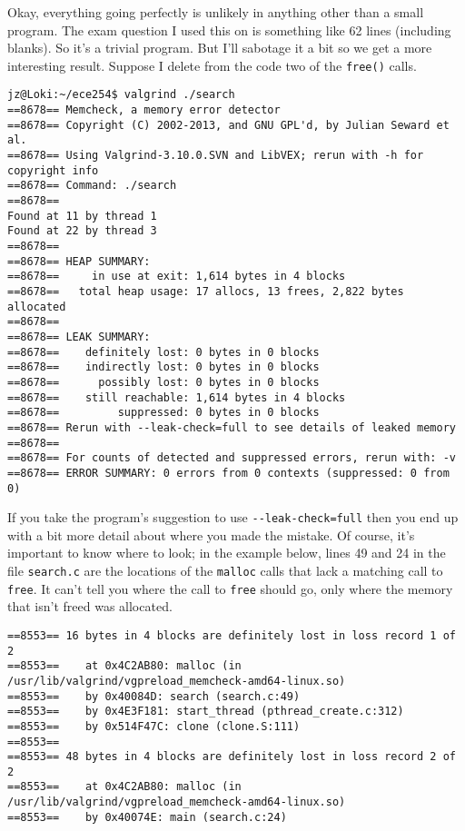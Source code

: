 Okay, everything going perfectly is unlikely in anything other than a small program. The exam question I used this on is something like 62 lines (including blanks). So it's a trivial program. But I'll sabotage it a bit so we get a more interesting result. Suppose I delete from the code two of the \texttt{free()} calls.

\begin{lstlisting}
jz@Loki:~/ece254$ valgrind ./search 
==8678== Memcheck, a memory error detector
==8678== Copyright (C) 2002-2013, and GNU GPL'd, by Julian Seward et al.
==8678== Using Valgrind-3.10.0.SVN and LibVEX; rerun with -h for copyright info
==8678== Command: ./search
==8678== 
Found at 11 by thread 1 
Found at 22 by thread 3 
==8678== 
==8678== HEAP SUMMARY:
==8678==     in use at exit: 1,614 bytes in 4 blocks
==8678==   total heap usage: 17 allocs, 13 frees, 2,822 bytes allocated
==8678== 
==8678== LEAK SUMMARY:
==8678==    definitely lost: 0 bytes in 0 blocks
==8678==    indirectly lost: 0 bytes in 0 blocks
==8678==      possibly lost: 0 bytes in 0 blocks
==8678==    still reachable: 1,614 bytes in 4 blocks
==8678==         suppressed: 0 bytes in 0 blocks
==8678== Rerun with --leak-check=full to see details of leaked memory
==8678== 
==8678== For counts of detected and suppressed errors, rerun with: -v
==8678== ERROR SUMMARY: 0 errors from 0 contexts (suppressed: 0 from 0)
\end{lstlisting}

If you take the program's suggestion to use \verb+--leak-check=full+ then you end up with a bit more detail about where you made the mistake. Of course, it's important to know where to look; in the example below, lines 49 and 24 in the file \texttt{search.c} are the locations of the \texttt{malloc} calls that lack a matching call to \texttt{free}. It can't tell you where the call to \texttt{free} should go, only where the memory that isn't freed was allocated.

\begin{lstlisting}
==8553== 16 bytes in 4 blocks are definitely lost in loss record 1 of 2
==8553==    at 0x4C2AB80: malloc (in /usr/lib/valgrind/vgpreload_memcheck-amd64-linux.so)
==8553==    by 0x40084D: search (search.c:49)
==8553==    by 0x4E3F181: start_thread (pthread_create.c:312)
==8553==    by 0x514F47C: clone (clone.S:111)
==8553== 
==8553== 48 bytes in 4 blocks are definitely lost in loss record 2 of 2
==8553==    at 0x4C2AB80: malloc (in /usr/lib/valgrind/vgpreload_memcheck-amd64-linux.so)
==8553==    by 0x40074E: main (search.c:24)

\end{lstlisting}

